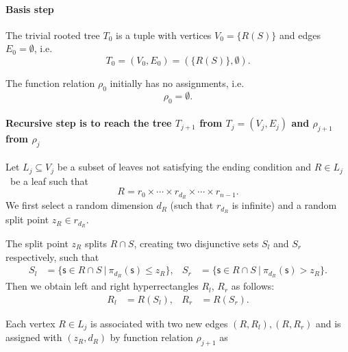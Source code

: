 \paragraph{Basis step}
The trivial rooted tree \(T_0\) is a tuple with
vertices \(V_0 = \{R(S)\}\) and edges \(E_0 = \emptyset\), i.e. 
\[T_0= (V_0, E_0) = (\{R(S)\},\emptyset).\]

The function relation $\rho_0$ initially has no assignments, i.e.
$$\rho_0 = \emptyset.$$

\paragraph{Recursive step
is to reach the tree \(T_{j+1}\) from \(T_{j} = (V_j, E_j)\) and $\rho_{j+1}$ from $\rho_{j}$}
Let \(L_j \subseteq V_j\) be a subset of leaves not satisfying the
ending condition
and \(R \in L_j\)\ be a leaf such that
\[R =  r_0 \times \cdots \times r_{d_R} \times \cdots \times r_{n-1}. \]
We first select a random dimension $d_R$ (such that $r_{d_R}$ is infinite) and a random split point $z_R \in r_{d_R}$.


The split point $z_R$ splits $R \cap S$, creating two disjunctive sets $S_l$ and $S_r$ respectively, such that
\begin{align*}
S_l &= \{ \mathsf{s} \in{R \cap S}\ |\ \pi_{d_R}(\mathsf{s})\le z_R\},&
S_r &= \{ \mathsf{s} \in{R \cap S}\ |\ \pi_{d_R}(\mathsf{s}) > z_R\}.
\end{align*}
Then we obtain left and right hyperrectangles \(R_l\), \(R_r\) as
follows:
\begin{align*}
R_l &= R(S_l),&
R_r &= R(S_r).
\end{align*}

Each vertex \(R \in L_j\) is associated with two new
edges \((R,R_l ), (R, R_r)\) and is assigned with $(z_R,d_R)$ by function relation $\rho_{j+1}$ as


